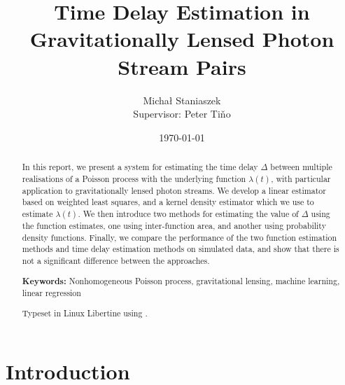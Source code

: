 \documentclass[a4paper,11pt]{article}
\title{Time Delay Estimation in Gravitationally Lensed Photon Stream Pairs}
\author{\Large{Micha{\l} Staniaszek} \\\small{Supervisor: Peter Ti{\v{n}}o}}
\date{\today}
\begin{document}
\maketitle


\thispagestyle{empty}
\newpage
{}
\begin{abstract}
In this report, we present a system for estimating the time delay $\Delta$
between multiple realisations of a Poisson process with the underlying function
$\lambda(t)$, with particular application to gravitationally lensed photon
streams. We develop a linear estimator based on weighted least squares, and a
kernel density estimator which we use to estimate $\lambda(t)$. We then
introduce two methods for estimating the value of $\Delta$ using the function
estimates, one using inter-function area, and another using probability density
functions. Finally, we compare the performance of the two function estimation
methods and time delay estimation methods on simulated data, and show that there
is not a significant difference between the approaches.

\vspace{1.0cm}\noindent\textbf{Keywords:} Nonhomogeneous Poisson process, gravitational lensing,
machine learning, linear regression

\begin{center}
\vspace*{\fill}\scriptsize{Typeset in Linux Libertine using \XeLaTeX}.
\end{center}
\end{abstract}
\newpage
\tableofcontents
\newpage
{}
\section{Introduction}
\label{sec-1}
\end{document}

